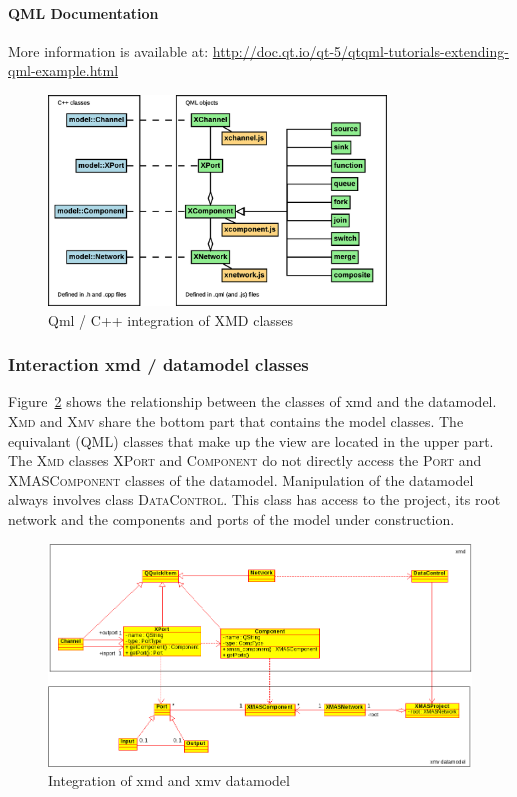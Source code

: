 \paragraph{QML Documentation}
More information is available at:
\url{http://doc.qt.io/qt-5/qtqml-tutorials-extending-qml-example.html}


\begin{figure}
    \centering
    \includegraphics[width=0.8\textwidth]{qml-cpp-classes}
    \caption{Qml / C++ integration of XMD classes}
    \label{fig:qml-cpp-classes}
\end{figure}

\subsubsection{Interaction xmd / datamodel classes}

Figure~\ref{fig:xmd-xmv-integration} shows the relationship between the classes of
xmd and the datamodel. \textsc{Xmd} and \textsc{Xmv} share the bottom part that contains
the model classes.
The equivalant (QML) classes that make up the view are
located in the upper part. The \textsc{Xmd} classes \textsc{XPort} and \textsc{Component}
do not directly access the \textsc{Port} and \textsc{XMASComponent} classes of the datamodel. 
Manipulation of the datamodel always involves class \textsc{DataControl}. This class has 
access to the project, its root network and the components and ports of the model under 
construction.

\begin{figure}[ht]
    \includegraphics[width=\textwidth]{xmd-xmv-integration}
    \caption{Integration of xmd and xmv datamodel}
    \label{fig:xmd-xmv-integration}
\end{figure}

